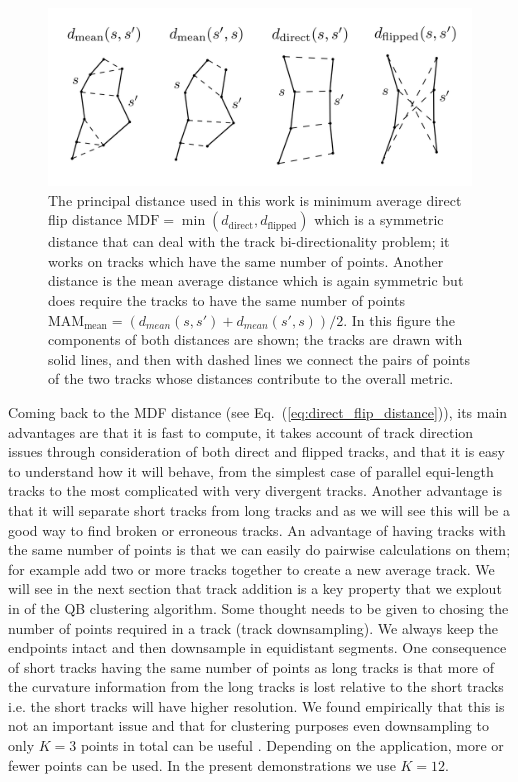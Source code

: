 \documentclass[preprint,authoryear,a4paper,10pt,onecolumn]{elsarticle}
\begin{document}
\begin{figure}
\includegraphics[scale=0.5]{distances2}
\centering{}\caption{The principal distance used in this work is minimum average
direct flip distance $\textrm{MDF}=\min(d_{\textrm{direct}},d_{\textrm{flipped}})$
which is a symmetric distance that can deal with the track bi-directionality
problem; it works on tracks which have the same number of points.
Another distance is the mean average distance which is again symmetric
but does require the tracks to have the same number of points
$\textrm{MAM}_{\textrm{mean}}=(d_{mean}(s,s')+d_{mean}(s',s))/2$.
In this figure the components of both distances are shown; the tracks are drawn with solid
lines, and then with dashed lines we connect the
pairs of points of the two tracks whose distances contribute to the
overall metric.\label{Flo:Distances_used}}
\end{figure}

Coming back to the MDF distance (see Eq.~(\ref{eq:direct_flip_distance})),
its main advantages are that it is fast to compute, it takes account of
track direction issues through consideration of both direct and flipped
tracks, and that it is easy to understand how it will behave, from the
simplest case of parallel equi-length tracks to the most complicated
with very divergent tracks. Another advantage is that it will separate
short tracks from long tracks and as we will see this will be a good way
to find broken or erroneous tracks. An advantage of having tracks with
the same number of points is that we can easily do pairwise calculations
on them; for example add two or more tracks together to create a new
average track. We will see in the next section that track addition is a
key property that we explout in of the QB clustering algorithm.  Some
thought needs to be given to chosing the number of points
required in a track (track downsampling). We always keep the endpoints
intact and then downsample in equidistant segments. One consequence of short
tracks having the same number of points as long tracks is that more
of the curvature information from the long tracks is lost relative to the short
tracks i.e. the short tracks will have higher resolution.  We found
empirically that this is not an important issue and that for clustering
purposes even downsampling to only $K=3$ points in total can be useful
\citep{EGMB10}. Depending on the application, more or fewer points can be
used. In the present demonstrations we use $K=12$.
\end{document}
